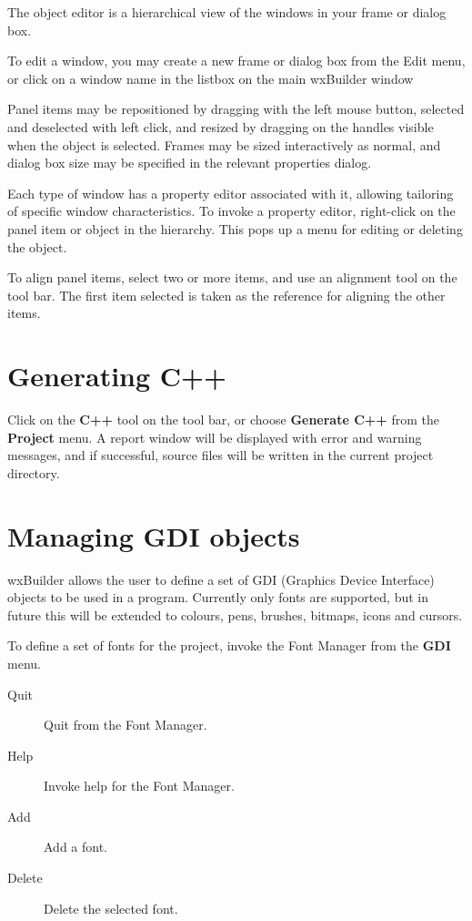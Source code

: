 The object editor is a hierarchical view of the windows in
your frame or dialog box.

To edit a window, you may create a new frame or dialog box from the Edit
menu, or click on a window name in the listbox on the main wxBuilder
window

Panel items may be repositioned by dragging with the left mouse button,
selected and deselected with left click, and resized by dragging
on the handles visible when the object is selected. Frames may
be sized interactively as normal, and dialog box size may be specified
in the relevant properties dialog.

Each type of window has a property editor associated with it, allowing
tailoring of specific window characteristics. To invoke a property
editor, right-click on the panel item or object in
the hierarchy. This pops up a menu for editing or deleting the object.

To align panel items, select two or more items, and use an alignment
tool on the tool bar. The first item selected is taken as the
reference for aligning the other items.

\section{Generating C++}

Click on the {\bf C++} tool on the tool bar, or choose {\bf Generate C++}\rtfsp
from the {\bf Project} menu. A report window will be displayed with
error and warning messages, and if successful, source files will be
written in the current project directory.

%

\section{Managing GDI objects}

wxBuilder allows the user to define a set of GDI (Graphics Device
Interface) objects to be used in a program. Currently only fonts are
supported, but in future this will be extended to colours, pens,
brushes, bitmaps, icons and cursors.

To define a set of fonts for the project, invoke the Font Manager
from the {\bf GDI} menu.

\begin{description}
\item[Quit] Quit from the Font Manager.
\item[Help] Invoke help for the Font Manager.
\item[Add] Add a font.
\item[Delete] Delete the selected font.
\end{description}

